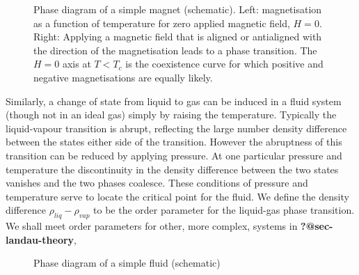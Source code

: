\documentclass[
  letterpaper,
  DIV=11,
  numbers=noendperiod]{scrreprt}
\begin{document}
\begin{figure}


\caption{\label{fig-isingpd}Phase diagram of a simple magnet
(schematic). Left: magnetisation as a function of temperature for zero
applied magnetic field, \(H=0\). Right: Applying a magnetic field that
is aligned or antialigned with the direction of the magnetisation leads
to a phase transition. The \(H=0\) axis at \(T<T_c\) is the coexistence
curve for which positive and negative magnetisations are equally
likely.}

\end{figure}%

Similarly, a change of state from liquid to gas can be induced in a
fluid system (though not in an ideal gas) simply by raising the
temperature. Typically the liquid-vapour transition is abrupt,
reflecting the large number density difference between the states either
side of the transition. However the abruptness of this transition can be
reduced by applying pressure. At one particular pressure and temperature
the discontinuity in the density difference between the two states
vanishes and the two phases coalesce. These conditions of pressure and
temperature serve to locate the critical point for the fluid. We define
the density difference \(\rho_{liq}-\rho_{vap}\) to be the order
parameter for the liquid-gas phase transition. We shall meet order
parameters for other, more complex, systems in
\textbf{?@sec-landau-theory},

\begin{figure}


\caption{\label{fig-fluidpd}Phase diagram of a simple fluid (schematic)}

\end{figure}%
\end{document}
